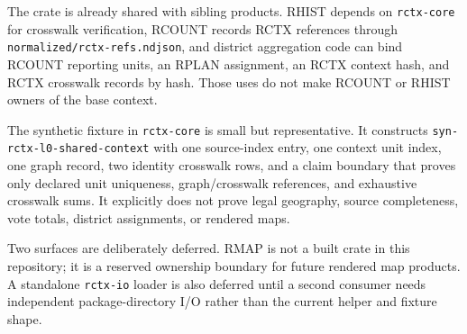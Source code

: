 The crate is already shared with sibling products. RHIST depends on
\texttt{rctx-core} for crosswalk verification, RCOUNT records RCTX references
through \texttt{normalized/rctx-refs.ndjson}, and district aggregation code can
bind RCOUNT reporting units, an RPLAN assignment, an RCTX context hash, and RCTX
crosswalk records by hash. Those uses do not make RCOUNT or RHIST owners of the
base context.

The synthetic fixture in \texttt{rctx-core} is small but representative. It
constructs \texttt{syn-rctx-l0-shared-context} with one source-index entry, one
context unit index, one graph record, two identity crosswalk rows, and a claim
boundary that proves only declared unit uniqueness, graph/crosswalk references,
and exhaustive crosswalk sums. It explicitly does not prove legal geography,
source completeness, vote totals, district assignments, or rendered maps.

Two surfaces are deliberately deferred. RMAP is not a built crate in this
repository; it is a reserved ownership boundary for future rendered map
products. A standalone \texttt{rctx-io} loader is also deferred until a second
consumer needs independent package-directory I/O rather than the current helper
and fixture shape.

